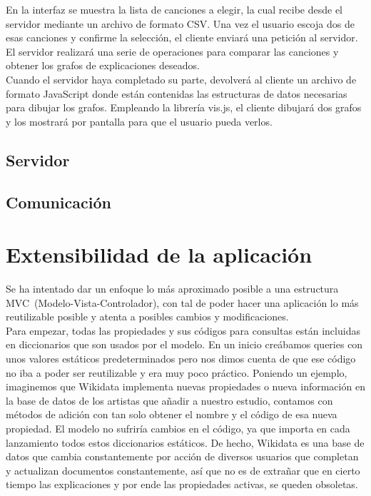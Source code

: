 En la interfaz se muestra la lista de canciones a elegir, la cual recibe desde el servidor mediante un archivo de formato CSV. Una vez el usuario escoja dos de esas canciones y confirme la selección, el cliente enviará una petición al servidor. El servidor realizará una serie de operaciones para comparar las canciones y obtener los grafos de explicaciones deseados.\\

Cuando el servidor haya completado su parte, devolverá al cliente un archivo de formato JavaScript donde están contenidas las estructuras de datos necesarias para dibujar los grafos. Empleando la librería vis.js, el cliente dibujará dos grafos y los mostrará por pantalla para que el usuario pueda verlos.\\

\subsection{Servidor}


\subsection{Comunicación}


\section{Extensibilidad de la aplicación}

Se ha intentado dar un enfoque lo más aproximado posible a una estructura MVC~(Modelo-Vista-Controlador), con tal de poder hacer una aplicación lo más reutilizable posible y atenta a posibles cambios y modificaciones.\\

Para empezar, todas las propiedades y sus códigos para consultas están incluidas en diccionarios que son usados por el modelo. En un inicio creábamos queries con unos valores estáticos predeterminados pero nos dimos cuenta de que ese código no iba a poder ser reutilizable y era muy poco práctico. Poniendo un ejemplo, imaginemos que Wikidata implementa nuevas propiedades o nueva información en la base de datos de los artistas que añadir a nuestro estudio, contamos con métodos de adición con tan solo obtener el nombre y el código de esa nueva propiedad. El modelo no sufriría cambios en el código, ya que importa en cada lanzamiento todos estos diccionarios estáticos. De hecho, Wikidata es una base de datos que cambia constantemente por acción de diversos usuarios que completan y actualizan documentos constantemente, así que no es de extrañar que en cierto tiempo las explicaciones y por ende las propiedades activas, se queden obsoletas.\\

